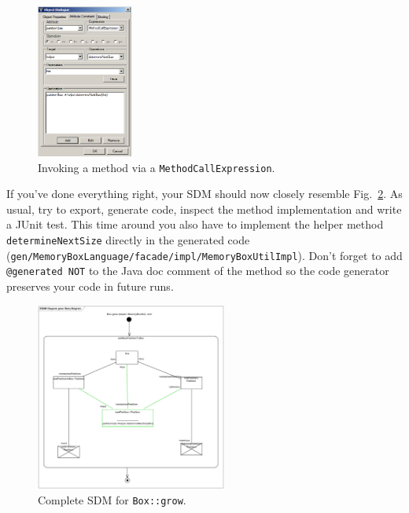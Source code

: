\begin{figure}[htbp]
\begin{center}
  \includegraphics[width=0.28\textwidth]{pics/sdmBilder/grow/sdm66}
  \caption{Invoking a method via a \texttt{MethodCallExpression}.}  
  \label{fig:sdm_grow_4}
\end{center}
\end{figure}

If you've done everything right, your SDM should now closely resemble
Fig.~\ref{fig:sdm_grow_5}.  As usual, try to export, generate code, inspect the
method implementation and write a JUnit test.  This time around you also have to
implement the helper method \texttt{determineNextSize} directly in the
generated code
(\texttt{gen/\-MemoryBoxLanguage/\-facade/\-impl/\-MemoryBoxUtilImpl}). Don't
forget to add \texttt{@generated NOT} to the Java doc comment of the
method so the code generator preserves your code in future runs.  

\begin{figure}[htbp]
\begin{center}
  \includegraphics[width=0.56\textwidth]{pics/sdmBilder/grow/sdm67}
  \caption{Complete SDM for \texttt{Box::grow}.}  
  \label{fig:sdm_grow_5}
\end{center}
\end{figure}
